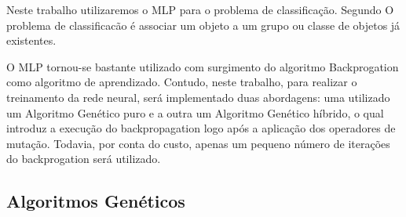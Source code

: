 \documentclass[12pt]{article}
\begin{document}
\par Neste trabalho utilizaremos o MLP para o problema de classificação. Segundo \cite{kasabov} O problema de classificacão é associar um objeto a um grupo ou classe de objetos já existentes. 

\par O MLP tornou-se bastante utilizado com surgimento do algoritmo Backprogation como algoritmo de aprendizado. Contudo, neste trabalho, para realizar o treinamento da rede neural, será implementado duas abordagens: uma utilizado um Algoritmo Genético puro e a outra um Algoritmo Genético híbrido, o qual introduz a execução do backpropagation logo após a aplicação dos operadores de mutação. Todavia, por conta do custo, apenas um pequeno número de iterações do backprogation será utilizado.

\subsection{Algoritmos Genéticos}
\end{document}
